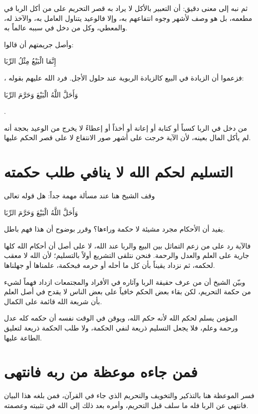 ثم نبه  إلى معنى دقيق: أن التعبير بالأكل لا يراد به قصر التحريم على من أكل الربا في مطعمه، بل هو وصف لأشهر وجوه انتفاعهم به، وإلا فالوعيد يتناول العامل به، والآخذ له، والمعطي، وكل من دخل في سببه عالماً به.

وأصل جريمتهم أن قالوا: \begin{ayah}إِنَّمَا الْبَيْعُ مِثْلُ الرِّبَا\end{ayah}، فزعموا أن الزيادة في البيع كالزيادة الربوية عند حلول الأجل. فرد الله عليهم بقوله: \begin{ayah}وَأَحَلَّ اللَّهُ الْبَيْعَ وَحَرَّمَ الرِّبَا\end{ayah}.

\begin{fawaid}
من دخل في الربا كسباً أو كتابة أو إعانة أو أخذاً أو إعطاءً لا يخرج من الوعيد بحجة أنه لم يأكل المال بعينه، لأن الآية خرجت على أشهر صور الانتفاع لا على قصر الحكم عليها.
\end{fawaid}

\section{التسليم لحكم الله لا ينافي طلب حكمته}
وقف الشيخ هنا عند مسألة مهمة جداً: هل قوله تعالى \begin{ayah}وَأَحَلَّ اللَّهُ الْبَيْعَ وَحَرَّمَ الرِّبَا\end{ayah} يفيد أن الأحكام مجرد مشيئة لا حكمة وراءها؟ وقرر بوضوح أن هذا فهم باطل.

فالآية رد على من زعم التماثل بين البيع والربا عند الله، لا على أصل أن أحكام الله كلها جارية على العلم والعدل والرحمة. فنحن نتلقى التشريع أولاً بالتسليم؛ لأن الله لا معقب لحكمه، ثم نزداد يقيناً بأن كل ما أحله أو حرمه فبحكمة، علمناها أو جهلناها.

وبيّن الشيخ أن من عرف حقيقة الربا وآثاره في الأفراد والمجتمعات ازداد فهماً لشيء من حكمة التحريم، لكن بقاء بعض الحكم خافياً على بعض الناس لا يقدح في أصل العلم بأن شريعة الله قائمة على الكمال.

\begin{fawaid}
المؤمن يسلم لحكم الله لأنه حكم الله، ويوقن في الوقت نفسه أن حكمه كله عدل ورحمة وعلم، فلا يجعل التسليم ذريعة لنفي الحكمة، ولا طلب الحكمة ذريعة لتعليق الطاعة عليها.
\end{fawaid}

\section{فمن جاءه موعظة من ربه فانتهى}
فسر  الموعظة هنا بالتذكير والتخويف والتحريم الذي جاء في القرآن، فمن بلغه هذا البيان فانتهى عن الربا فله ما سلف قبل التحريم، وأمره بعد ذلك إلى الله في تثبيته وعصمته.

